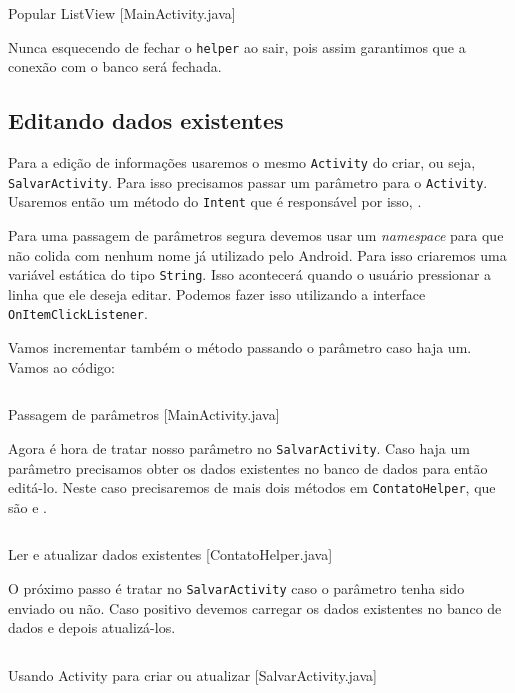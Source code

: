 \begin{listing}[H]
  \inputminted[linenos=true,frame=bottomline,tabsize=3]{ java }{ source/MainActivity-6.java }
  \caption{Popular ListView [MainActivity.java]}
\end{listing}

Nunca esquecendo de fechar o \texttt{helper} ao sair, pois assim garantimos que a conexão com
o banco será fechada.

\subsection{Editando dados existentes\label{ssec:edit}}

Para a edição de informações usaremos o mesmo \texttt{Activity} do criar, ou seja, \texttt{SalvarActivity}.
Para isso precisamos passar um parâmetro para o \texttt{Activity}. Usaremos então um método do
\texttt{Intent} que é responsável por isso, .

Para uma passagem de parâmetros segura devemos usar um \textit{namespace} para que não colida com
nenhum nome já utilizado pelo Android. Para isso criaremos uma variável estática do tipo \texttt{String}.
Isso acontecerá quando o usuário pressionar a linha que ele deseja editar. Podemos fazer isso utilizando
a interface \texttt{OnItemClickListener}.

Vamos incrementar também o método  passando o parâmetro caso haja um. Vamos ao
código:

\begin{listing}[H]
  \inputminted[linenos=true,frame=bottomline,tabsize=3]{ java }{ source/MainActivity-7.java }
  \caption{Passagem de parâmetros [MainActivity.java]}
\end{listing}

Agora é hora de tratar nosso parâmetro no \texttt{SalvarActivity}. Caso haja um parâmetro precisamos
obter os dados existentes no banco de dados para então editá-lo. Neste caso precisaremos de mais dois
métodos em \texttt{ContatoHelper}, que são  e .

\begin{listing}[H]
  \inputminted[linenos=true,frame=bottomline,tabsize=3]{ java }{ source/ContatoHelper-4.java }
  \caption{Ler e atualizar dados existentes [ContatoHelper.java]}
\end{listing}

O próximo passo é tratar no \texttt{SalvarActivity} caso o parâmetro tenha sido enviado ou não. Caso positivo
devemos carregar os dados existentes no banco de dados e depois atualizá-los.

\begin{listing}[H]
  \inputminted[linenos=true,frame=bottomline,tabsize=3]{ java }{ source/SalvarActivity-3.java }
  \caption{Usando Activity para criar ou atualizar [SalvarActivity.java]}
\end{listing}
